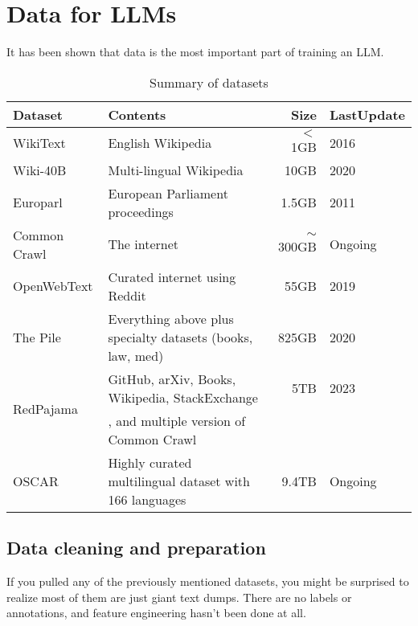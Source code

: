 \section{Data for LLMs}
It has been shown that data is the most important part of training an LLM. 



\begin{table}[h]
	\setlength{\tabcolsep}{4pt}
	\caption{Summary of datasets}
	\centering
	\begin{tabular}{llrl}
		\toprule
		Dataset & Contents & Size & LastUpdate \\
		\midrule
		WikiText & English Wikipedia & $<$1GB & 2016 \\
		Wiki-40B & Multi-lingual Wikipedia & 10GB & 2020 \\
		Europarl & European Parliament proceedings & 1.5GB & 2011 \\
		Common Crawl & The internet & $\sim$ 300GB & Ongoing \\
		OpenWebText & Curated internet using Reddit & 55GB & 2019 \\
		The Pile & Everything above plus specialty datasets (books, law, med) & 825GB & 2020 \\
		\multirow{2}{*}{RedPajama} & GitHub, arXiv, Books, Wikipedia, StackExchange & 5TB & 2023 \\
								  &, and multiple version of Common Crawl&\\
		OSCAR & Highly curated multilingual dataset with 166 languages & 9.4TB & Ongoing\\
		\bottomrule
	\end{tabular}
\end{table}


\subsection{Data cleaning and preparation}
If you pulled any of the previously mentioned datasets, you might be surprised to realize most of them are just giant text dumps. There are no labels or annotations, and feature engineering hasn't been done at all. 

